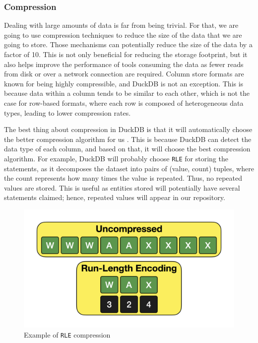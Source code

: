 \subsubsection{Compression}

Dealing with large amounts of data is far from being trivial. For that, we are going to use compression techniques to reduce the size of the data that we are going to store. Those mechanisms can potentially reduce the size of the data by a factor of 10. This is not only beneficial for reducing the storage footprint, but it also helps improve the performance of tools consuming the data as fewer reads from disk or over a network connection are required. Column store formats are known for being highly compressible, and DuckDB is not an exception. This is because data within a column tends to be similar to each other, which is not the case for row-based formats, where each row is composed of heterogeneous data types, leading to lower compression rates.

The best thing about compression in DuckDB is that it will automatically choose the better compression algorithm for us \cite{Raasveldt_2022}. This is because DuckDB can detect the data type of each column, and based on that, it will choose the best compression algorithm. For example, DuckDB will probably choose \texttt{RLE} for storing the statements, as it decomposes the dataset into pairs of (value, count) tuples, where the count represents how many times the value is repeated. Thus, no repeated values are stored. This is useful as entities stored will potentially have several statements claimed; hence, repeated values will appear in our repository.

\begin{figure}[ht]
    \centering
    \includegraphics[width=.8\linewidth]{figures/diagrams/10-2_rle.png}
    \caption[Example of \texttt{RLE} compression]{Example of \texttt{RLE} compression \cite{Raasveldt_2022}}
\end{figure}

